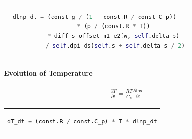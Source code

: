 \begin{center}
\begin{tabular}{c}
\begin{lstlisting}[language=Python]
dlnp_dt = (const.g / (1 - const.R / const.C_p)) 
           * (p / (const.R * T)) 
           * diff_s_offset_n1_e2(w, self.delta_s) 
           / self.dpi_ds(self.s + self.delta_s / 2)
\end{lstlisting}
\end{tabular}
\end{center}

\paragraph{Evolution of Temperature}
\begin{align*}
\frac{\partial T}{\partial t} = \frac{RT}{C_p}\frac{\partial \text{ln}p}{\partial t}
\end{align*}

\begin{center}
\begin{tabular}{c}
\begin{lstlisting}[language=Python]
dT_dt = (const.R / const.C_p) * T * dlnp_dt
\end{lstlisting}
\end{tabular}
\end{center}


